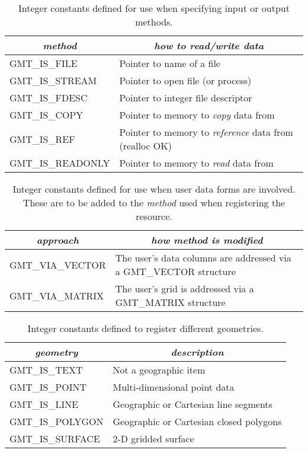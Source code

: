 \documentclass{report}
\begin{document}
\begin{table}[h]
\small
\centering
\begin{tabular}{|l|l|} \hline
\multicolumn{1}{|c|}{\emph{method}} & \multicolumn{1}{c|}{\emph{how to read/write data}} \\ \hline
GMT\_IS\_FILE		&       Pointer to name of a file \\ \hline
GMT\_IS\_STREAM		&       Pointer to open file (or process)  \\ \hline
GMT\_IS\_FDESC		&       Pointer to integer file descriptor \\ \hline
GMT\_IS\_COPY		&       Pointer to memory to \emph{copy} data from \\ \hline
GMT\_IS\_REF		&       Pointer to memory to \emph{reference} data from (realloc OK) \\ \hline
GMT\_IS\_READONLY	&       Pointer to memory to \emph{read} data from \\ \hline
\end{tabular}
\caption{Integer constants defined for use when specifying input or output methods.}
\label{tbl:methods}
\end{table}

\begin{table}[h]
\small
\centering
\begin{tabular}{|l|l|} \hline
\multicolumn{1}{|c|}{\emph{approach}} & \multicolumn{1}{c|}{\emph{how method is modified}} \\ \hline
GMT\_VIA\_VECTOR	&       The user's data columns are addressed via a GMT\_VECTOR structure \\ \hline
GMT\_VIA\_MATRIX	&       The user's grid is addressed via a GMT\_MATRIX structure \\ \hline
\end{tabular}
\caption{Integer constants defined for use when user data forms are involved.  These are to be added
to the \emph{method} used when registering the resource.}
\label{tbl:via}
\end{table}

\begin{table}[h]
\small
\centering
\begin{tabular}{|l|l|} \hline
\multicolumn{1}{|c|}{\emph{geometry}} & \multicolumn{1}{c|}{\emph{description}} \\ \hline
GMT\_IS\_TEXT		&       Not a geographic item \\ \hline
GMT\_IS\_POINT		&       Multi-dimensional point data \\ \hline
GMT\_IS\_LINE		&       Geographic or Cartesian line segments \\ \hline
GMT\_IS\_POLYGON	&       Geographic or Cartesian closed polygons \\ \hline
GMT\_IS\_SURFACE	&       2-D gridded surface \\ \hline
\end{tabular}
\caption{Integer constants defined to register different geometries.}
\label{tbl:geometry}
\end{table}
\end{document}

